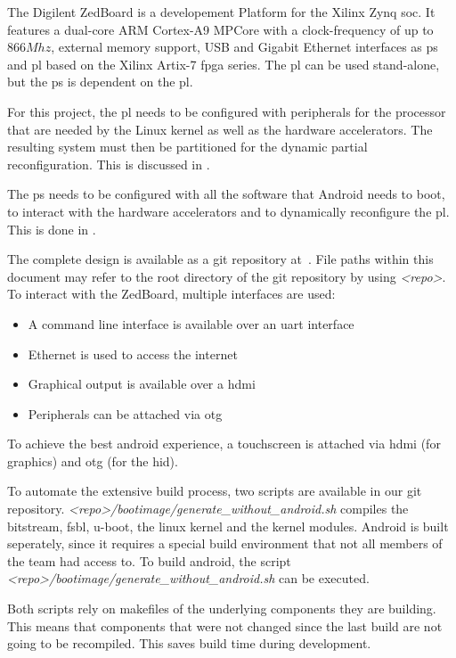 The Digilent ZedBoard is a developement Platform for the Xilinx Zynq \gls{soc}.
It features a dual-core ARM Cortex-A9 MPCore with a clock-frequency of up to
$866 Mhz$, external memory support, USB and Gigabit Ethernet interfaces as
\gls{ps} and \gls{pl} based on the Xilinx Artix-7 \gls{fpga} series.
The \gls{pl} can be used stand-alone, but the \gls{ps} is dependent on the
\gls{pl}.

For this project, the \gls{pl} needs to be configured with peripherals for the
processor that are needed by the Linux kernel as well as the hardware
accelerators.
The resulting system must then be partitioned for the dynamic partial
reconfiguration.
This is discussed in .

The \gls{ps} needs to be configured with all the software that Android needs to
boot, to interact with the hardware accelerators and to dynamically reconfigure
the \gls{pl}.
This is done in .

The complete design is available as a git repository at~\cite{repo}.
File paths within this document may refer to the root directory of the git
repository by using \emph{<repo>}.
To interact with the ZedBoard, multiple interfaces are used:
\begin{itemize}
	\item A command line interface is available over an \gls{uart} interface
	\item Ethernet is used to access the internet
	\item Graphical output is available over a \gls{hdmi}
	\item Peripherals can be attached via \gls{otg}
\end{itemize}
To achieve the best android experience, a touchscreen is attached via \gls{hdmi}
(for graphics) and \gls{otg} (for the \gls{hid}).

To automate the extensive build process, two scripts are available in our git
repository.
\emph{<repo>/bootimage/generate\_without\_android.sh} compiles the bitstream,
\gls{fsbl}, u-boot, the linux kernel and the kernel modules.
Android is built seperately, since it requires a special build environment that
not all members of the team had access to.
To build android, the script
\emph{<repo>/bootimage/generate\_without\_android.sh} can be executed.

Both scripts rely on makefiles of the underlying components they are building.
This means that components that were not changed since the last build are not
going to be recompiled.
This saves build time during development.
